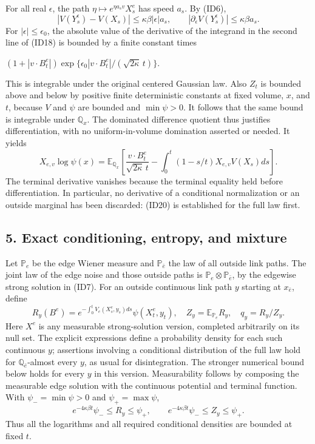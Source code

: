 \documentclass[11pt]{article}
\begin{document}
For all real \(\epsilon\), the path \(\eta\mapsto e^{\eta a_sv}X_s^e\) has speed \(a_s\). By (ID6),
\[
 |V(Y_s^\epsilon)-V(X_s)|\le\kappa\beta|\epsilon|a_s,\qquad
 |\partial_\epsilon V(Y_s^\epsilon)|\le\kappa\beta a_s.
 \tag{ID19}
\]
For \(|\epsilon|\le\epsilon_0\), the absolute value of the derivative of the integrand in the second line of (ID18) is bounded by a finite constant times

\( (1+|v\cdot B_t^e|)\exp\{\epsilon_0|v\cdot B_t^e|/(\sqrt{2\kappa}\,t)\}.\)

This is integrable under the original centered Gaussian law. Also \(Z_t\) is bounded above and below by positive finite deterministic constants at fixed volume, \(x\), and \(t\), because \(V\) and \(\psi\) are bounded and \(\min\psi>0\). It follows that the same bound is integrable under \(\mathbb Q_x\). The dominated difference quotient thus justifies differentiation, with no uniform-in-volume domination asserted or needed. It yields
\[
 X_{e,v}\log\psi(x)
 =\mathbb E_{\mathbb Q_x}\left[
    \frac{v\cdot B_t^e}{\sqrt{2\kappa}\,t}
       -\int_0^t(1-s/t)X_{e,v}V(X_s)ds\right].
 \tag{ID20}
\]
The terminal derivative vanishes because the terminal equality held before differentiation. In particular, no derivative of a conditional normalization or an outside marginal has been discarded: (ID20) is established for the full law first.

\subsection*{5. Exact conditioning, entropy, and mixture}

Let \(\mathbb P_e\) be the edge Wiener measure and \(\mathbb P_{\bar e}\) the law of all outside link paths. The joint law of the edge noise and those outside paths is \(\mathbb P_e\otimes\mathbb P_{\bar e}\), by the edgewise strong solution in (ID7). For an outside continuous link path \(y\) starting at \(x_{\bar e}\), define
\[
 R_y(B^e)=e^{-\int_0^tV_e(X_s^e,y_s)ds}\psi(X_t^e,y_t),\quad
 Z_y=\mathbb E_{\mathbb P_e}R_y,\quad q_y=R_y/Z_y.
 \tag{ID21}
\]
Here \(X^e\) is any measurable strong-solution version, completed arbitrarily on its null set. The explicit expressions define a probability density for each such continuous \(y\); assertions involving a conditional distribution of the full law hold for \(\mathbb Q_{\bar e}\)-almost every \(y\), as usual for disintegration. The stronger numerical bound below holds for every \(y\) in this version. Measurability follows by composing the measurable edge solution with the continuous potential and terminal function. With \(\psi_-=\min\psi>0\) and \(\psi_+=\max\psi\),
\[
 e^{-4\kappa\beta t}\psi_-\le R_y\le\psi_+,\qquad
 e^{-4\kappa\beta t}\psi_-\le Z_y\le\psi_+.
 \tag{ID22}
\]
Thus all the logarithms and all required conditional densities are bounded at fixed \(t\).
\end{document}
